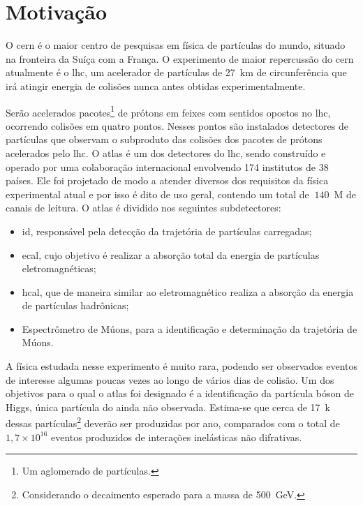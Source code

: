 \section{Motivação}

O \gls{cern} é o maior centro de
pesquisas em física de partículas do mundo, situado na fronteira da Suíça com a
França. O experimento de maior repercussão do \gls{cern} atualmente é o \gls{lhc}, 
um acelerador de partículas de 27~km de
circunferência que irá atingir energia de colisões nunca antes obtidas
experimentalmente. 

Serão acelerados pacotes\footnote{Um aglomerado de partículas.} de prótons em
feixes com sentidos opostos no \gls{lhc},
ocorrendo colisões em quatro pontos. Nesses pontos são instalados 
detectores de partículas que observam o subproduto das colisões dos pacotes de prótons 
acelerados pelo \gls{lhc}. O \gls{atlas} é um dos detectores do
\gls{lhc}, sendo construído e operado por uma colaboração internacional envolvendo 174 institutos de 38
países. Ele foi projetado de modo a atender diversos dos requisitos da física 
experimental atual e por isso é dito de uso geral, contendo um total de $~140$~M 
de canais de leitura. O \gls{atlas} é dividido nos seguintes subdetectores:

\begin{itemize}
\item \gls{id}, responsável pela detecção da trajetória de partículas carregadas;
\item \gls{ecal}, cujo objetivo é realizar a absorção total da
energia de partículas eletromagnéticas;
\item \gls{hcal}, que de maneira similar ao eletromagnético realiza a
absorção da energia de partículas hadrônicas;
\item Espectrômetro de Múons, para a identificação e determinação da trajetória de
Múons.
\end{itemize}

A física estudada nesse experimento é muito rara, podendo ser observados eventos
de interesse algumas poucas vezes ao longo de vários dias de colisão. 
Um dos objetivos para o qual o \gls{atlas} foi 
designado é a identificação da partícula bóson de Higgs, única partícula 
do  ainda não observada. Estima-se que cerca de 17~k dessas
partículas\footnote{Considerando o decaimento esperado para a massa de 500~GeV.} deverão ser produzidas por ano, comparados
com o total de $1,7\times10^{16}$ eventos produzidos de interações inelásticas
não difrativas. 

